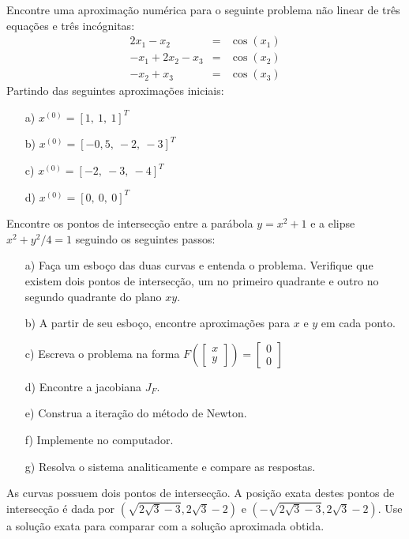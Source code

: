 \begin{exer} Encontre uma aproximação numérica para o seguinte problema não linear de três equações e três incógnitas:
\begin{eqnarray}
2x_1-x_2&=&\cos(x_1)\\
-x_1+2x_2-x_3&=&\cos(x_2)\\
-x_2+	x_3&=&\cos(x_3)
\end{eqnarray}
Partindo das seguintes aproximações iniciais:
\begin{itemize}
\item[a)] $x^{(0)}=[1,~1,~1]^T$
\item[b)] $x^{(0)}=[-0,5,~-2,~-3]^T$
\item[c)] $x^{(0)}=[-2,~-3,~-4]^T$
\item[d)] $x^{(0)}=[0,~0,~0]^T$
\end{itemize}
\end{exer}
\begin{resp}
  \construirResp
\end{resp}


\begin{exer}\label{prob_para_elipse}
 Encontre os pontos de intersecção entre a parábola $y=x^2+1$ e a elipse $x^2+y^2/4=1$ seguindo os seguintes passos:
\begin{itemize}
\item[a)] Faça um esboço das duas curvas e entenda o problema. Verifique que existem dois pontos de intersecção, um no primeiro quadrante e outro no segundo quadrante do plano $xy$.
\item[b)] A partir de seu esboço, encontre aproximações para $x$ e $y$ em cada ponto.
\item[c)] Escreva o problema na forma $F\left(\left[\begin{array}{c}x\\y\end{array}\right]\right)=\left[\begin{array}{c}0\\0\end{array}\right]$
\item[d)] Encontre a jacobiana $J_F$.
\item[e)] Construa a iteração do método de Newton.
\item[f)] Implemente no computador.
\item[g)] Resolva o sistema analiticamente e compare as respostas.
\end{itemize}
\end{exer}
\begin{resp}
As curvas possuem dois pontos de intersecção. A posição exata destes pontos de intersecção é dada por $\left(\sqrt{2\sqrt{3}-3},2\sqrt{3}-2\right)$ e $\left(-\sqrt{2\sqrt{3}-3},2\sqrt{3}-2\right)$. Use a solução exata para comparar com a solução aproximada obtida.
\end{resp}


